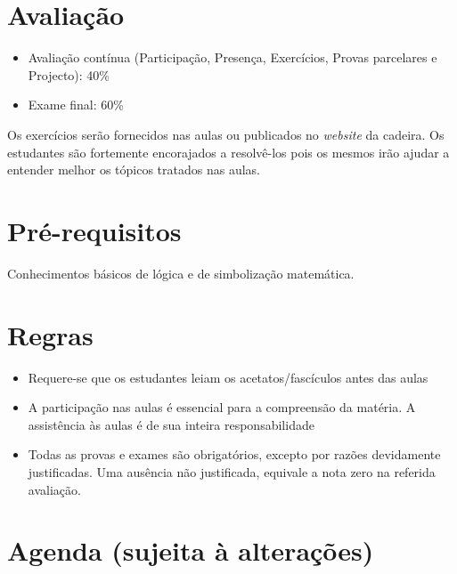\section*{Avaliação}%
\begin{itemize}
  \item Avaliação contínua (Participação, Presença, Exercícios, Provas
  parcelares e Projecto): 40\%
  \item Exame final: 60\%
\end{itemize}

Os exercícios serão fornecidos nas aulas ou publicados no \emph{website} da cadeira. Os estudantes são fortemente encorajados
a resolvê-los pois os mesmos irão ajudar a entender melhor os tópicos tratados
nas aulas.
%
\section*{Pré-requisitos}

Conhecimentos básicos de lógica e de simbolização matemática.

\section*{Regras}

\begin{itemize}
  \item {Requere-se que os estudantes leiam os acetatos/fascículos antes das
  aulas}
  \item {A participação nas aulas é essencial para a compreensão da matéria. A assistência às aulas é de sua inteira
  responsabilidade}
  \item {Todas as provas e exames são obrigatórios, excepto por razões devidamente justificadas. Uma ausência não justificada, 
  equivale a nota zero na referida avaliação.}
\end{itemize}

\section*{Agenda (sujeita à alterações)}

